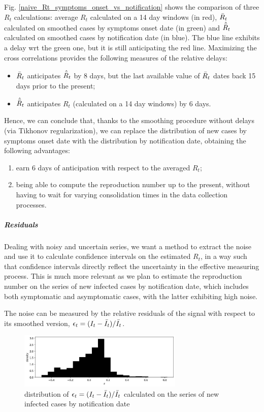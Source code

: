 \documentclass[graybox]{svmult}
\begin{document}
Fig. \ref{naive_Rt_symptoms_onset_vs_notification} shows the comparison of three $R_t$ calculations: average $R_t$ calculated on a 14 day windows (in red), $\Bar{R}_t$ calculated on smoothed cases by symptoms onset date (in green) and $\hat{\Bar{R}}_{t}$ calculated on smoothed cases by notification date (in blue). The blue line exhibits a delay wrt the green one, but it is still anticipating the red line. Maximizing the cross correlations provides the following measures of the relative delays:
\begin{itemize}
    \item $\Bar{R}_t$ anticipates $\hat{\Bar{R}}_{t}$ by 8 days, but the last available value of $\Bar{R}_t$ dates back 15 days prior to the present;
    \item $\hat{\Bar{R}}_{t}$ anticipates $R_t$ (calculated on a 14 day windows) by 6 days.
\end{itemize}

Hence, we can conclude that, thanks to the smoothing procedure without delays (via Tikhonov regularization), we can replace the distribution of new cases by symptoms onset date with the distribution by notification date, obtaining the following advantages:
\begin{enumerate}
    \item earn 6 days of anticipation with respect to the averaged $R_t$;
    \item being able to compute the reproduction number up to the present, without having to wait for varying consolidation times in the data collection processes.
\end{enumerate}

\subparagraph{Residuals}

Dealing with noisy and uncertain series, we want a method to extract the noise and use it to calculate confidence intervals on the estimated $R_t$, in a way such that confidence intervals directly reflect the uncertainty in the effective measuring process. This is much more relevant as we plan to estimate the reproduction number on the series of new infected cases by notification date, which includes both symptomatic and asymptomatic cases, with the latter exhibiting high noise.

The noise can be measured by the relative residuals of the signal with respect to its smoothed version, $\epsilon_t = (I_t - \Bar{I}_t)/\Bar{I}_t$.

\begin{figure}[t]
\center
\includegraphics[width=0.7\textwidth]{Rt_images/epsilon_tikhonov_distribution.jpg}
\caption{distribution of $\epsilon_t = (I_t - \Bar{I}_t)/\Bar{I}_t$ calculated on the series of new infected cases by notification date}
\label{epsilon_tikhonov_distribution}
\end{figure}
\end{document}
